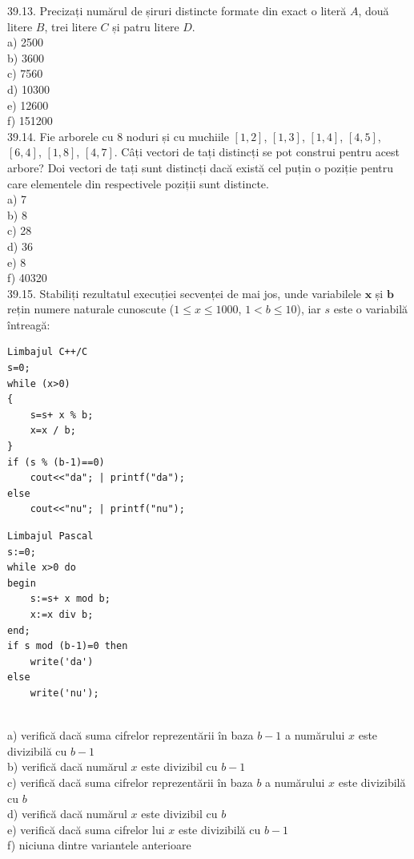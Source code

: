 \begin{itemize}
\begin{enumerate}
39.13. Precizați numărul de șiruri distincte formate din exact o literă $A$, două litere $B$, trei litere $C$ și patru litere $D$.
\\
a) 2500
\\
b) 3600
\\
c) 7560
\\
d) 10300
\\
e) 12600
\\
f) 151200
\\
39.14. Fie arborele cu 8 noduri și cu muchiile $[1,2]$, $[1,3]$, $[1,4]$, $[4,5]$, $[6,4]$, $[1,8]$, $[4,7]$. Câți vectori de tați distincți se pot construi pentru acest arbore? Doi vectori de tați sunt distincți dacă există cel puțin o poziție pentru care elementele din respectivele poziții sunt distincte.
\\
a) 7
\\
b) 8
\\
c) 28
\\
d) 36
\\
e) 8
\\
f) 40320
\\
39.15. Stabiliți rezultatul execuției secvenței de mai jos, unde variabilele $\mathbf{x}$ și $\mathbf{b}$ rețin numere naturale cunoscute ($1 \leq x \leq 1000$, $1<b \leq 10$), iar $s$ este o variabilă întreagă:
\begin{verbatim}
Limbajul C++/C
s=0;
while (x>0)
{
    s=s+ x % b;
    x=x / b;
}
if (s % (b-1)==0)
    cout<<"da"; | printf("da");
else
    cout<<"nu"; | printf("nu");
\end{verbatim}
\begin{verbatim}
Limbajul Pascal
s:=0;
while x>0 do
begin
    s:=s+ x mod b;
    x:=x div b;
end;
if s mod (b-1)=0 then
    write('da')
else
    write('nu');
\end{verbatim}
\\
a) verifică dacă suma cifrelor reprezentării în baza $b-1$ a numărului $x$ este divizibilă cu $b-1$
\\
b) verifică dacă numărul $x$ este divizibil cu $b-1$
\\
c) verifică dacă suma cifrelor reprezentării în baza $b$ a numărului $x$ este divizibilă cu $b$
\\
d) verifică dacă numărul $x$ este divizibil cu $b$
\\
e) verifică dacă suma cifrelor lui $x$ este divizibilă cu $b-1$
\\
f) niciuna dintre variantele anterioare
\\


\end{enumerate}
\end{itemize}

